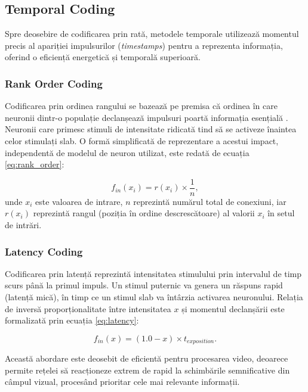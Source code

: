\subsection*{Temporal Coding}
Spre deosebire de codificarea prin rată, metodele temporale utilizează momentul precis al apariției impulsurilor (\textit{timestamps}) pentru a reprezenta informația, oferind o eficiență energetică și temporală superioară.

\subsubsection{Rank Order Coding}
Codificarea prin ordinea rangului \cite{thorpe1998} se bazează pe premisa că ordinea în care neuronii dintr-o populație declanșează impulsuri poartă informația esențială \cite{delorme2001}. Neuronii care primesc stimuli de intensitate ridicată tind să se activeze înaintea celor stimulați slab. O formă simplificată de reprezentare a acestui impact, independentă de modelul de neuron utilizat, este redată de ecuația \eqref{eq:rank_order}:

\begin{equation}
\label{eq:rank_order}
f_{in}(x_i) = r(x_i) \times \frac{1}{n},
\end{equation}
unde $x_i$ este valoarea de intrare, $n$ reprezintă numărul total de conexiuni, iar $r(x_i)$ reprezintă rangul (poziția în ordine descrescătoare) al valorii $x_i$ în setul de intrări.

\subsubsection{Latency Coding}
Codificarea prin latență \cite{gollisch2008} reprezintă intensitatea stimulului prin intervalul de timp scurs până la primul impuls. Un stimul puternic va genera un răspuns rapid (latență mică), în timp ce un stimul slab va întârzia activarea neuronului. Relația de inversă proporționalitate între intensitatea $x$ și momentul declanșării este formalizată prin ecuația \eqref{eq:latency}:

\begin{equation}
\label{eq:latency}
f_{in}(x) = (1.0 - x) \times t_{exposition}.
\end{equation}

Această abordare este deosebit de eficientă pentru procesarea video, deoarece permite rețelei să reacționeze extrem de rapid la schimbările semnificative din câmpul vizual, procesând prioritar cele mai relevante informații.

